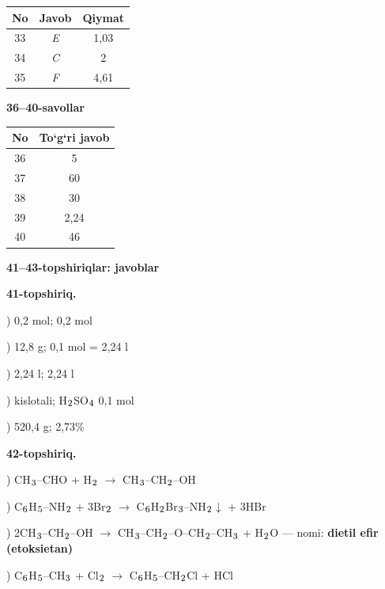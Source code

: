 \documentclass[11pt,a4paper]{article}
\renewcommand{\textsubscript}[1]{\ensuremath{_{\text{\fontsize{8}{8}\selectfont #1}}}}
\begin{document}
\noindent\begin{tabular}{|c|c|c|}\hline \textbf{No} & \textbf{Javob} & \textbf{Qiymat}\\\hline
33 & \textsl{E} & 1,03\\\hline
34 & \textsl{C} & 2\\\hline
35 & \textsl{F} & 4,61\\\hline
\end{tabular}\par\medskip
\noindent\textbf{36--40-savollar}\par\smallskip
\noindent\begin{tabular}{|c|c|}\hline \textbf{No} & \textbf{To`g`ri javob}\\\hline
36 & 5\\\hline
37 & 60\\\hline
38 & 30\\\hline
39 & 2,24\\\hline
40 & 46\\\hline
\end{tabular}\par\medskip
\noindent\textbf{41--43-topshiriqlar: javoblar}\par\smallskip
\noindent\textbf{41-topshiriq.}\par
{}) 0,2 mol; 0,2 mol\par
{}) 12,8 g; 0,1 mol = 2,24 l\par
{}) 2,24 l; 2,24 l\par
{}) kislotali; H\textsubscript{2}SO\textsubscript{4} 0,1 mol\par
{}) 520,4 g; 2,73\%\par
\noindent\textbf{42-topshiriq.}\par
{}) CH\textsubscript{3}--CHO + H\textsubscript{2} $\to$ CH\textsubscript{3}--CH\textsubscript{2}--OH\par
{}) C\textsubscript{6}H\textsubscript{5}--NH\textsubscript{2} + 3Br\textsubscript{2} $\to$ C\textsubscript{6}H\textsubscript{2}Br\textsubscript{3}--NH\textsubscript{2}$\downarrow$ + 3HBr\par
{}) 2CH\textsubscript{3}--CH\textsubscript{2}--OH $\to$ CH\textsubscript{3}--CH\textsubscript{2}--O--CH\textsubscript{2}--CH\textsubscript{3} + H\textsubscript{2}O --- nomi: \textbf{dietil efir (etoksietan)}\par
{}) C\textsubscript{6}H\textsubscript{5}--CH\textsubscript{3} + Cl\textsubscript{2} $\to$ C\textsubscript{6}H\textsubscript{5}--CH\textsubscript{2}Cl + HCl\par
\end{document}
